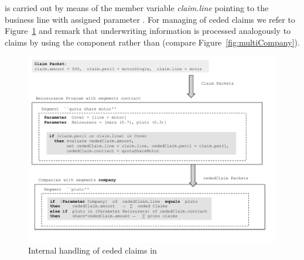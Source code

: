 is carried out by means of the member variable {\em claim.line} pointing to the business
line with assigned parameter .
For managing of ceded claims we refer to Figure~\ref{fig:processingCededClaims} and remark
that underwriting information is processed analogously to claims by using the component
 rather than
 (compare Figure~\ref{fig:multiCompany}).
\begin{figure}[htb]
	\centering
	\includegraphics[scale=0.45]{images/ProcessingCededClaims.pdf}
	\caption{Internal handling of ceded claims in }
	\label{fig:processingCededClaims}
\end{figure}
